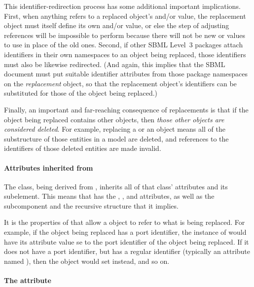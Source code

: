 This identifier-redirection process has some additional important
implications.  First, when anything refers to a replaced object's
 and/or  value, the replacement object must
itself define its own  and/or  value, or else
the step of adjusting references will be impossible to perform because
there will not be new  or  values to use in
place of the old ones.  Second, if other SBML Level~3 packages attach
identifiers in their own namespaces to an object being replaced, those
identifiers must also be likewise redirected.  (And again, this implies
that the SBML document must put suitable identifier attributes from
those package namespaces on the \emph{replacement} object, so that the
replacement object's identifiers can be substituted for those of the
object being replaced.)

Finally, an important and far-reaching consequence of replacements is
that if the object being replaced contains other objects, then
\emph{those other objects are considered deleted}.  For example,
replacing a \Reaction or an \Event object means all of the substructure
of those entities in a model are deleted, and references to the
identifiers of those deleted entities are made invalid.


\paragraph{Attributes inherited from }

The \ReplacedElement class, being derived from \SBaseRef, inherits all
of that class' attributes and its subelement.  This means that
\ReplacedElement has the , , 
and  attributes, as well as the subcomponent
 and the recursive structure that it implies.

It is the properties of \SBaseRef that allow a \ReplacedElement object
to refer to what is being replaced.  For example, if the object being
replaced has a port identifier, the instance of \ReplacedElement would
have its  attribute value se to the port identifier of
the object being replaced.  If it does not have a port identifier, but
has a regular identifier (typically an attribute named ), then
the \ReplacedElement object would set  instead, and so on.


\paragraph{The \hspace*{1pt} attribute}
\label{replacedelement-submodelref}

